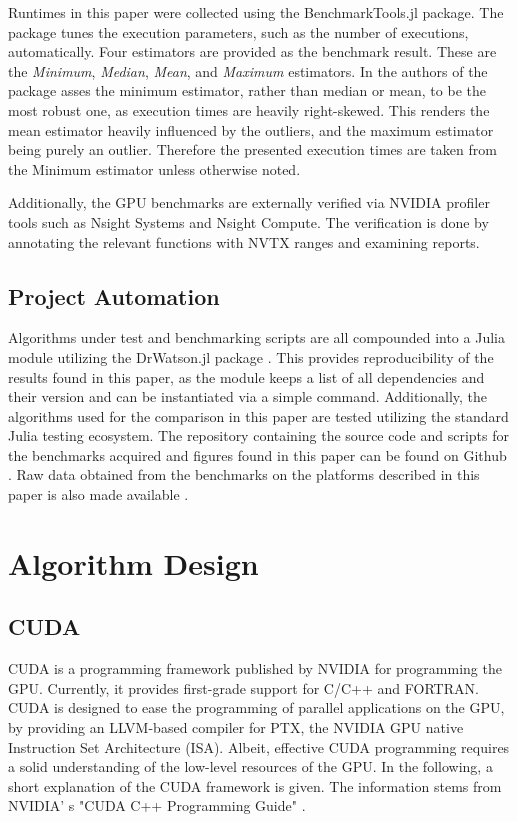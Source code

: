 \documentclass{juliacon}
\begin{document}
Runtimes in this paper were collected using the BenchmarkTools.jl package. The package tunes the execution parameters, such as the number of executions, automatically. Four estimators are provided as the benchmark result. These are the \emph{Minimum}, \emph{Median}, \emph{Mean}, and \emph{Maximum} estimators. In \cite{Chen2016} the authors of the package asses the minimum estimator, rather than median or mean, to be the most robust one, as execution times are heavily right-skewed. This renders the mean estimator heavily influenced by the outliers, and the maximum estimator being purely an outlier. Therefore the presented execution times are taken from the Minimum estimator unless otherwise noted.

Additionally, the GPU benchmarks are externally verified via NVIDIA profiler tools such as Nsight Systems and Nsight Compute. The verification is done by annotating the relevant functions with NVTX ranges and examining reports.

\subsection*{Project Automation}
Algorithms under test and benchmarking scripts are all compounded into a Julia module utilizing the DrWatson.jl package \cite{Datseris2020}. This provides reproducibility of the results found in this paper, as the module keeps a list of all dependencies and their version and can be instantiated via a simple command. Additionally, the algorithms used for the comparison in this paper are tested utilizing the standard Julia testing ecosystem. The repository containing the source code and scripts for the benchmarks acquired and figures found in this paper can be found on Github \cite{Ozmaden2022}. Raw data obtained from the benchmarks on the platforms described in this paper is also made available \cite{Ozmaden2022_2}.

\section{Algorithm Design}\label{sec:algorithm-design}
\subsection*{CUDA}
CUDA is a programming framework published by NVIDIA for programming the GPU. Currently, it provides first-grade support for C/C++ and FORTRAN. CUDA is designed to ease the programming of parallel applications on the GPU, by providing an LLVM-based compiler for PTX, the NVIDIA GPU native Instruction Set Architecture (ISA). Albeit, effective CUDA programming requires a solid understanding of the low-level resources of the GPU. In the following, a short explanation of the CUDA framework is given. The information stems from NVIDIA'
s "CUDA C++ Programming Guide" \cite{NVIDIA2022}.
\end{document}
